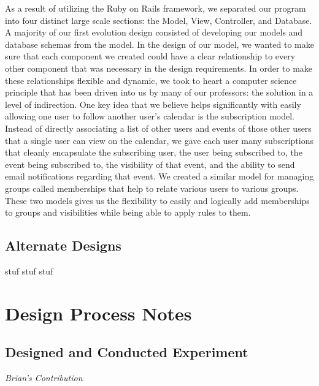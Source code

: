 \documentclass[11pt]{article}
\begin{document}
As a result of utilizing the Ruby on Rails framework, we separated our program into four distinct large scale sections: the Model, View, Controller, and Database.  A majority of our first evolution design consisted of developing our models and database schemas from the model.  In the design of our model, we wanted to make sure that each component we created could have a clear relationship to every other component that was necessary in the design requirements.  In order to make these relationships flexible and dynamic, we took to heart a computer science principle that has been driven into us by many of our professors: the solution in a level of indirection.  One key idea that we believe helps significantly with easily allowing one user to follow another user's calendar is the subscription model.  Instead of directly associating a list of other users and events of those other users that a single user can view on the calendar, we gave each user many subscriptions that cleanly encapsulate the subscribing user, the user being subscribed to, the event being subscribed to, the visibility of that event, and the ability to send email notifications regarding that event.  We created a similar model for managing groups called memberships that help to relate various users to various groups.  These two models gives us the flexibility to easily and logically add memberships to groups and visibilities while being able to apply rules to them.

\subsection{Alternate Designs}

stuf stuf stuf

\section{Design Process Notes}

\subsection{Designed and Conducted Experiment}

\textit{Brian's Contribution}
\end{document}
